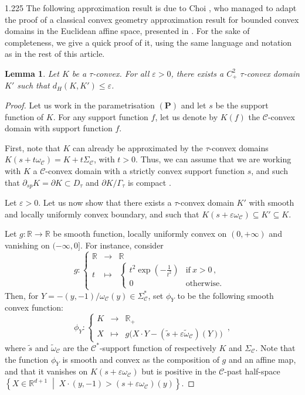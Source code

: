 \documentclass[reqno, a4paper]{amsart}
\numberwithin{equation}{section}
\numberwithin{figure}{section}
\newtheorem{lemma}[theorem]{Lemma}
\theoremstyle{definition}
\theoremstyle{remark}
\newcommand{\R}{\mathbb{R}} %
\newcommand{\C}{\mathcal{C}} %
\renewcommand{\S}{\Sigma_\C} %
\newcommand{\st}{\; \middle\vert \;} %
\newcommand{\namelessfunction}[4]{ \left\lbrace \begin{matrix}
{#1} &\longrightarrow& {#2}\\
{#3} & \longmapsto & {#4}
\end{matrix} \right. }
\newcommand{\function}[5]{{#1}: \namelessfunction{#2}{#3}{#4}{#5}}
\newcommand{\vp}[1]{{\left( {#1} \right)}} %
\newcommand{\bp}[1]{{\bigl( {#1} \bigr)}} %
\begin{document}
\begin{spacing}{1.225}
The following approximation result is due to Choi \cite[Theorem~4.4.4]{Choi_25}, who managed to adapt the proof of a classical convex geometry approximation result for bounded convex domains in the Euclidean affine space, presented in \cite[Proposition~2.1]{Ghomi_04}. For the sake of completeness, we give a quick proof of it, using the same language and notation as in the rest of this article. 

\begin{lemma}
\label{lem smooth approx}
Let $K$ be a $\tau$-convex. For all $\varepsilon>0$, there exists a $C^2_+$ $\tau$-convex domain $K'$ such that $d_H(K,K') \leq \varepsilon$. 
\end{lemma}

\begin{proof}

Let us work in the parametrisation $(\mathbf{P})$ and let $s$ be the support function of $K$. For any support function $f$, let us denote by $K(f)$ the $\C$-convex domain with support function $f$. 

First, note that $K$ can already be approximated by the $\tau$-convex domains $K(s+t\omega_\C)=K+t\S$, with $t>0$. Thus, we can assume that we are working with $K$ a $\C$-convex domain with a strictly convex support function $s$, and such that $\partial_{sp} K =\partial K \subset D_\tau$ \cite[Lemma~6.4]{Ablondi_25} and $\partial K /\Gamma_\tau$ is compact \cite[Lemma~7.6]{Ablondi_25}. 

Let $\varepsilon>0$. Let us now show that there exists a $\tau$-convex domain $K'$ with smooth and locally uniformly convex boundary, and such that $K(s+\varepsilon \omega_\C) \subseteq K' \subseteq K$. 

Let $g:\R \to \R$ be smooth function, locally uniformly convex on $(0,+\infty)$ and vanishing on $(-\infty,0]$. For instance, consider
\begin{equation*}
 \function{g}{\R}{\R}{t}{\begin{cases}
 t^2 \exp\vp{-\frac{1}{t^2}} & \text{if} \ x>0 \, , \\
 0 & \text{otherwise. }
 \end{cases}}
\end{equation*}
Then, for $Y = -(y,-1)/\omega_\C(y) \in \Sigma_\C^*$, set $\phi_Y$ to be the following smooth convex function:
\begin{equation*}
\function{\phi_Y}{K}{\R_+}{X}{g\bp{X\cdot Y-(\tilde s+\varepsilon\tilde\omega_\C)(Y)}} \, ,
\end{equation*}
where $\tilde s$ and $\tilde \omega_\C$ are the $\C^*$-support function of respectively $K$ and $\S$. Note that the function $\phi_Y$ is smooth and convex as the composition of $g$ and an affine map, and that it vanishes on $K(s+\varepsilon \omega_\C)$ but is positive in the $\C$-past half-space $\left\lbrace X \in \R^{d+1} \st X\cdot(y,-1)>(s+\varepsilon\omega_\C)(y)\right\rbrace$. 


\end{proof}
\end{spacing}
\end{document}
